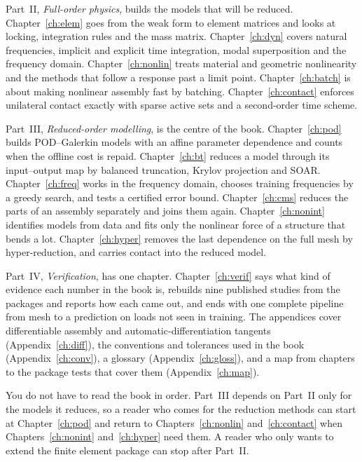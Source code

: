 Part~II, \emph{Full-order physics}, builds the models that will be reduced. Chapter~\ref{ch:elem} goes from the weak form to element matrices and looks at locking, integration rules and the mass matrix. Chapter~\ref{ch:dyn} covers natural frequencies, implicit and explicit time integration, modal superposition and the frequency domain. Chapter~\ref{ch:nonlin} treats material and geometric nonlinearity and the methods that follow a response past a limit point. Chapter~\ref{ch:batch} is about making nonlinear assembly fast by batching. Chapter~\ref{ch:contact} enforces unilateral contact exactly with sparse active sets and a second-order time scheme.

Part~III, \emph{Reduced-order modelling}, is the centre of the book. Chapter~\ref{ch:pod} builds POD--Galerkin models with an affine parameter dependence and counts when the offline cost is repaid. Chapter~\ref{ch:bt} reduces a model through its input--output map by balanced truncation, Krylov projection and SOAR. Chapter~\ref{ch:freq} works in the frequency domain, chooses training frequencies by a greedy search, and tests a certified error bound. Chapter~\ref{ch:cms} reduces the parts of an assembly separately and joins them again. Chapter~\ref{ch:nonint} identifies models from data and fits only the nonlinear force of a structure that bends a lot. Chapter~\ref{ch:hyper} removes the last dependence on the full mesh by hyper-reduction, and carries contact into the reduced model.

Part~IV, \emph{Verification}, has one chapter. Chapter~\ref{ch:verif} says what kind of evidence each number in the book is, rebuilds nine published studies from the packages and reports how each came out, and ends with one complete pipeline from mesh to a prediction on loads not seen in training. The appendices cover differentiable assembly and automatic-differentiation tangents (Appendix~\ref{ch:diff}), the conventions and tolerances used in the book (Appendix~\ref{ch:conv}), a glossary (Appendix~\ref{ch:gloss}), and a map from chapters to the package tests that cover them (Appendix~\ref{ch:map}).

You do not have to read the book in order. Part~III depends on Part~II only for the models it reduces, so a reader who comes for the reduction methods can start at Chapter~\ref{ch:pod} and return to Chapters~\ref{ch:nonlin} and~\ref{ch:contact} when Chapters~\ref{ch:nonint} and~\ref{ch:hyper} need them. A reader who only wants to extend the finite element package can stop after Part~II.

